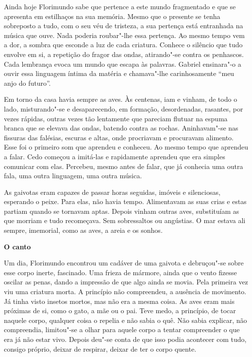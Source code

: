 Ainda hoje Florimundo sabe que pertence a este mundo fragmentado e que
se apresenta em estilhaços na sua memória. Mesmo que o presente se tenha
sobreposto a tudo, com o seu véu de tristeza, a sua pertença está
entranhada na música que ouve. Nada poderia roubar"-lhe essa pertença. Ao
mesmo tempo vem a dor, a sombra que esconde a luz de cada criatura.
Conhece o silêncio que tudo envolve em si, a repetição do fragor das
ondas, atirando"-se contra os penhascos. Cada lembrança evoca um mundo
que escapa às palavras. Gabriel ensinara"-o a ouvir essa linguagem íntima
da matéria e chamava"-lhe carinhosamente ``meu anjo do futuro''.

Em torno da casa havia sempre as aves. Às centenas, iam e vinham, de
todo o lado, misturando"-se e desaparecendo, em formação, desordenadas,
rasantes, por vezes rápidas, outras vezes tão lentamente que pareciam
flutuar na espuma branca que se elevava das ondas, batendo contra as
rochas. Aninhavam"-se nas fissuras das falésias, escuras e altas, onde
procriavam e procuravam alimento. Esse foi o primeiro som que aprendeu e
conheceu. Ao mesmo tempo que aprendeu a falar. Cedo começou a imitá-las
e rapidamente aprendeu que era simples comunicar com elas. Percebeu,
mesmo antes de falar, que já conhecia uma outra fala, uma outra
linguagem, uma outra música.

As gaivotas eram capazes de passar horas seguidas, imóveis e
silenciosas, esperando o peixe. Para elas, não havia tempo. Alimentavam
as suas crias e estas partiam quando se tornavam aptas. Depois vinham
outras aves, substituíam as que morriam e tudo recomeçava. Sem
sobressaltos ou angústias. O mar estava ali sempre, imemorial, como as
aves, a areia e os sonhos.


\vspace*{1.8cm}
\noindent{}\textbf{O canto}

\bigskip

Um dia, Florimundo encontrou um cadáver de uma gaivota e debruçou"-se
sobre esse corpo inerte, fascinado. Uma frieza de mármore, ainda que o
vento fizesse oscilar as penas, dando a impressão de que algo ainda se
movia. Pela primeira vez viu uma criatura morta. A princípio não
compreendeu, a ausência de movimento. Já tinha visto insetos mortos,
mas não era a mesma coisa. As aves eram mais próximas de si, como o
gato, a mãe ou o pai. Teve medo, a princípio, de tocar naquele corpo,
qualquer coisa o repelia e não sabia o quê. Não sabia explicar, não
compreendia, limitou"-se a olhar para aquele corpo a tentar compreender o
que era já não estar vivo. Depois deu"-se conta de que isso podia
acontecer com tudo, consigo próprio, deixar de respirar, deixar de ter o
corpo quente.

